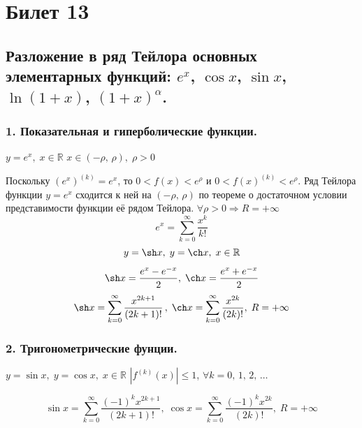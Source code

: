 \documentclass[a4paper,12pt]{article} %
\newcommand{\ryad}{\sum\limits^{\infty}_{k = 0}}
\renewcommand {\le}{\leqslant}
\begin{document}
\section{Билет 13}
\subsection{Разложение в ряд Тейлора основных элементарных функций: $e^x$, $\cos x$, $\sin x$, $\ln (1 + x)$, $(1 + x)^{\alpha}$.}
\subsubsection*{1. Показательная и гиперболические функции.}
\begin{center}
$y = e^x, \; x \in \mathbb{R}$
\vspace{8pt}
$x \in (-\rho, \, \rho), \; \rho > 0$
\end{center}
Поскольку $(e^x)^{(k)} = e^x $, то $0 < f(x) < e^{\rho}$ и $0 < f(x)^{(k)} < e^{\rho}$. Ряд Тейлора функции $y = e^x$ сходится к ней на $( - \rho, \, \rho)$ по теореме о достаточном условии представимости функции её рядом Тейлора.
$\forall \rho > 0 \Rightarrow R = + \infty$
\[ e^x = \ryad \frac{x^k}{k!}\]
\[y = \sh x, \; y = \ch x, \; x \in \mathbb{R} \]
\[ \sh x = \frac{e^x - e^{-x}}{2}, \; \ch x = \frac{e^x + e^{-x}}{2} \]
\[ \sh x = \ryad \frac{x^{2k + 1}}{(2k + 1)!} \,, \; \ch x = \ryad \frac{x^{2k}}{(2k)!}, \; R = +\infty\]
\subsubsection*{2. Тригонометрические фунции.}
\begin{center}
$y = \sin x, \; y = \cos x, \; x \in \mathbb{R}$
\vspace{8pt}
$| f^{(k)} (x) | \le 1$, $\forall k = 0, \, 1, \, 2, \, \ldots$
\end{center}

$$ 
\sin x = \ryad \frac{(-1)^k x^{2k + 1}}{(2k + 1)!}, \; \cos x = \ryad \frac{(-1)^k x^{2k}}{(2k)!}, \;R = + \infty
$$
\end{document}
